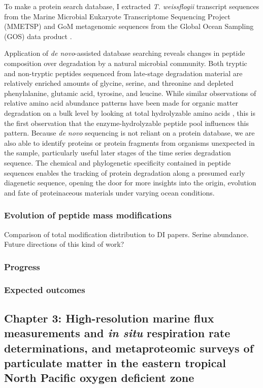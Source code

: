 \documentclass[12pt, letterpaper, twoside]{article}
\begin{document}
To make a protein search database, I extracted \textit{T. weissflogii} transcript sequences from the Marine Microbial Eukaryote Transcriptome Sequencing Project (MMETSP) \cite{keeling_marine_2014} and GoM metagenomic sequences from the Global Ocean Sampling (GOS) data product \cite{yooseph_sorcerer_2007}.
 
 Application of \textit{de novo}-assisted database searching reveals changes in peptide composition over degradation by a natural microbial community. Both tryptic and non-tryptic peptides sequenced from late-stage degradation material are relatively enriched amounts of glycine, serine, and threonine and depleted phenylalanine, glutamic acid, tyrosine, and leucine. While similar observations of relative amino acid abundance patterns have been made for organic matter degradation on a bulk level by looking at total hydrolyzable amino acids \cite{dauwe_linking_1999}, this is the first observation that the enzyme-hydrolyzable peptide pool influences this pattern. Because \textit{de novo} sequencing is not reliant on a protein database, we are also able to identify proteins or protein fragments from organisms unexpected in the sample, particularly useful later stages of the time series degradation sequence. The chemical and phylogenetic specificity contained in peptide sequences enables the tracking of protein degradation along a presumed early diagenetic sequence, opening the door for more insights into the origin, evolution and fate of proteinaceous materials under varying ocean conditions.

\subsubsection{Evolution of peptide mass modifications}

Comparison of total modification distribution to DI papers. Serine abundance. Future directions of this kind of work?

\subsubsection*{Progress}

\subsubsection*{Expected outcomes}


\subsection{Chapter 3: High-resolution marine flux measurements and \textit{in situ} respiration rate determinations, and metaproteomic surveys of particulate matter in the eastern tropical North Pacific oxygen deficient zone}
\end{document}
